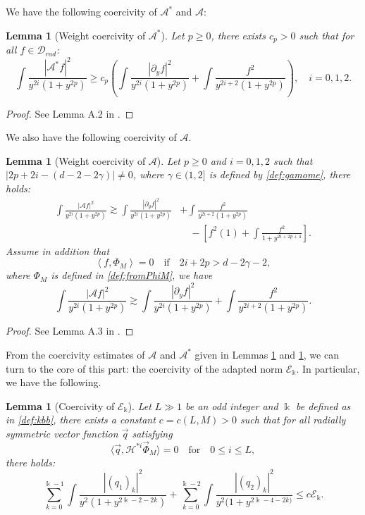 \documentclass[11pt]{aims}
\newtheorem{lemma}[theorem]{Lemma}
\theoremstyle{definition}
\numberwithin{equation}{section}
\begin{document}
We have the following coercivity of ${\mathscr{A}}^*$ and ${\mathscr{A}}$: 
\begin{lemma}[Weight coercivity of ${\mathscr{A}}^*$]\label{lemm:coerAst} Let $p \geq 0$, there exists $c_p > 0$ such that for all $f \in {\mathcal{D}}_{rad}$:
\begin{equation}\label{eq:coerAst}
\int \frac{|{\mathscr{A}}^* f|^2}{y^{2i}(1 + y^{2p})} \geq c_p\left(\int \frac{|{\partial_y} f|^2}{y^{2i}(1 + y^{2p})} + \int \frac{f^2}{y^{2i + 2}(1 + y^{2p})}\right), \quad i = 0, 1,2.
\end{equation}
\end{lemma}
\begin{proof} See Lemma A.2 in \cite{IGN16}.
\end{proof}
We also have the following coercivity of ${\mathscr{A}}$. 
\begin{lemma}[Weight coercivity of ${\mathscr{A}}$] \label{lemm:coerA} Let $p \geq 0$ and $i = 0, 1, 2$ such that $|2p + 2i - (d - 2 - 2\gamma)| \ne 0$, where $\gamma \in (1,2]$ is defined by \eqref{def:gamome}, there holds:
\begin{align}
\int \frac{|{\mathscr{A}} f|^2}{y^{2i}(1 + y^{2p})} \gtrsim \int \frac{|{\partial_y} f|^2}{y^{2i}(1 + y^{2p})} & + \int \frac{f^2}{y^{2i + 2}(1 + y^{2p})} \nonumber\\
&\quad - \left[f^2(1) + \int \frac{f^2}{1 +y^{2i + 2p + 4}} \right].\label{eq:subcoerA}
\end{align}
Assume in addition that 
$$\left<f, \Phi_M\right> = 0 \quad \text{if}\quad 2i + 2p > d - 2\gamma - 2,$$
where $\Phi_M$ is defined in \eqref{def:fromPhiM}, we have 
\begin{equation}\label{eq:coerA}
\int \frac{|{\mathscr{A}} f|^2}{y^{2i}(1 + y^{2p})} \gtrsim \int \frac{|{\partial_y} f|^2}{y^{2i}(1 + y^{2p})} + \int \frac{f^2}{y^{2i + 2}(1 + y^{2p})}.
\end{equation}
\end{lemma}
\begin{proof} See Lemma A.3 in \cite{IGN16}.
\end{proof}
From the coercivity estimates of ${\mathscr{A}}$ and ${\mathscr{A}}^*$ given in Lemmas \ref{lemm:coerA} and \ref{lemm:coerAst}, we can turn to the core of this part: the coercivity of the adapted norm ${\mathscr{E}}_{\Bbbk}$. In particular, we have the following.
\begin{lemma}[Coercivity of ${\mathscr{E}}_\Bbbk$]  \label{lemm:coerEk} Let $L \gg 1$ be an odd integer and $\Bbbk$ be defined as in \eqref{def:kbb}, there exists a constant $c = c(L, M) > 0$ such that for all radially symmetric vector function $\vec q$ satisfying
\begin{equation}\label{ap:ortHk}
\big \langle \vec q, {\mathscr{H}}^{*i}\vec \Phi_M \big \rangle = 0 \quad \text{for} \quad 0 \leq i \leq L,
\end{equation}
there holds:
\begin{equation}
\sum_{k = 0}^{\Bbbk - 1}\int \frac{|(q_1)_k|^2}{y^2(1 + y^{2\Bbbk -2 - 2k})} + \sum_{k = 0}^{\Bbbk - 2}\int \frac{|(q_2)_k|^2}{y^2(1 + y^{2\Bbbk - 4 - 2k)}} \leq c{\mathscr{E}}_\Bbbk.
\end{equation}
\end{lemma}
\end{document}
